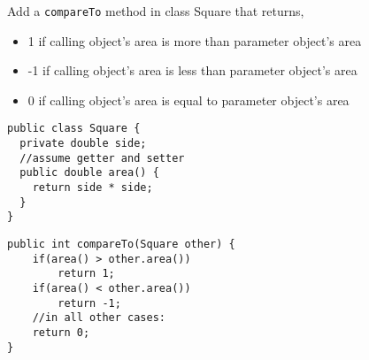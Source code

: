 \begin{exercise}
Add a \texttt{compareTo} method in class Square that returns,

\begin{itemize}
\item 1 if calling object's area is more than parameter object's area 
\item -1 if calling object's area is less than parameter object's area 
\item 0 if calling object's area is equal to parameter object's area 
\end{itemize}
\begin{lstlisting}[frame=single,style=buggy]
public class Square {
  private double side;
  //assume getter and setter
  public double area() {
    return side * side;
  }
}
\end{lstlisting}  	
\end{exercise}
\begin{answer} \begin{lstlisting}
public int compareTo(Square other) {
	if(area() > other.area())
		return 1;
	if(area() < other.area())
		return -1;
	//in all other cases:
	return 0;
}
\end{lstlisting} \end{answer}  
  
